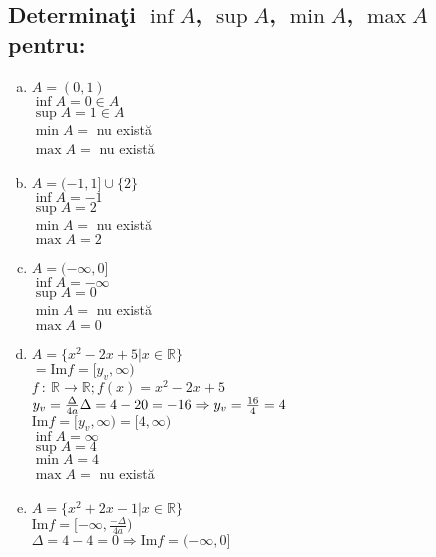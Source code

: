 \documentclass[a4paper, 12pt, notitlepage]{book}
\begin{document}
    \subsection{Determina\c{t}i $\inf A$, $\sup A$, $\min A$, $\max A$ pentru:}
    \begin{enumerate}[a.]
      \item $A = ({0,1})$\\
            $\inf A = 0 \in A$\\
            $\sup A = 1 \in A$\\
            $\min A =$ nu exist\u{a}\\
            $\max A =$ nu exist\u{a}

      \item $A = ({-1, 1}] \cup \{2\} $\\
            $\inf A = -1$\\
            $\sup A = 2$\\
            $\min A =$ nu exist\u{a}\\
            $\max A = 2$

      \item $A = ({-\infty, 0}]$\\
            $\inf A = -\infty$\\
            $\sup A = 0$\\
            $\min A =$ nu exist\u{a}\\
            $\max A = 0$

      \item $A = \{x^{2} - 2x +5 \vert x \in \mathbb{R}\}$\\
            $= \text{Im} f= [{y_{v}, \infty})$\\
            $f\ :\ \mathbb{R} \to \mathbb{R}; f(x) = x^{2} - 2x +5$\\
            $y_{v} = \frac{\Delta}{4a}\\
            \Delta = 4-20 = -16 \Rightarrow y_{v} = \frac{16}{4} = 4$\\

            $\text{Im} f= [{y_{v}, \infty}) = [{4, \infty})$\\

            $\inf A = \infty$\\
            $\sup A = 4$\\
            $\min A = 4$ \\
            $\max A = $ nu exist\u{a}

      \item $A = \{x^{2} + 2x - 1 \vert x \in \mathbb{R}\}$\\
            $\text{Im} f= [{-\infty, \frac{-\Delta}{4a}})$\\
            $\Delta = 4-4 = 0 \Rightarrow \text{Im} f= ({-\infty, 0}]$


\end{enumerate}
\end{document}
